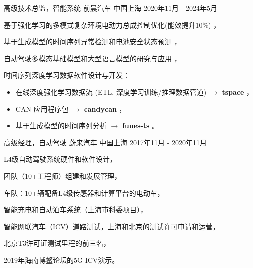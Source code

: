 \documentclass[../resume_cn.tex]{subfiles}
\begin{document}


\begin{cventries}

  \cventry
    {高级技术总监，智能系统} %
    {前晨汽车} %
    {中国上海} %
    {2020年11月 - 2024年5月} %
    {
      \begin{cvitems} %
          \item 基于强化学习的多模式复杂环境电动力总成控制优化(能效提升10\%) \supercite{Xin_VEOS_22}，
          \item 基于生成模型的时间序列异常检测和电池安全状态预测 \supercite{Xin_GenAI_23}，
          \item 自动驾驶多模态基础模型和大型语言模型的研究与应用 \supercite{Xin_VLM_24} \supercite{Xin_Latent_Diffusion_23}，
          \item 时间序列深度学习数据软件设计与开发：
            \begin{itemize}
                    \item 在线深度强化学习数据流 (ETL, 深度学习训练/推理数据管道) $\rightarrow$ \textbf{tspace} \href{https://binjian.github.io/tspace/}{\faGithub}，
                    \item CAN 应用程序包 $\rightarrow$ \textbf{candycan} \href{https://binjian.github.io/candycan/}{\faGithub}，
                    \item 基于生成模型的时间序列分析 $\rightarrow$ \textbf{funes-ts} \href{https://github.com/binjian/funes-ts/}{\faGithub}。
            \end{itemize}
      \end{cvitems}
    }

  \cventry
    {高级经理，自动驾驶} %
    {蔚来汽车} %
    {中国上海} %
    {2017年11月 - 2020年11月} %
    {
      \begin{cvitems}
        \item L4级自动驾驶系统硬件和软件设计，
        \item 团队（10+工程师）组建和发展管理，
        \item 车队：10+辆配备L4级传感器和计算平台的电动车，
        \item 智能充电和自动泊车系统（上海市科委项目），
        \item 智能网联汽车（ICV）道路测试，上海和北京的测试许可申请和运营，
        \item 北京T3许可证测试里程的前三名，
        \item 2019年海南博鳌论坛的5G ICV演示。
      \end{cvitems}
    }


\end{cventries}
\end{document}
